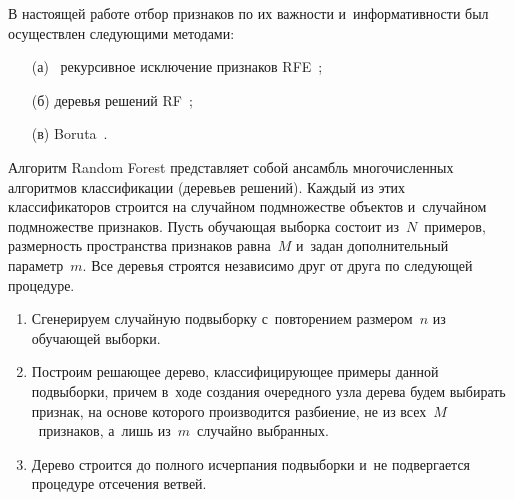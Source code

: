 \begin{multicols}{2}
  В настоящей работе отбор признаков по их важности и~информативности 
был осуществлен следующими методами:
\begin{itemize}
\item[(а)]~рекурсивное исключение 
признаков RFE~\cite{9-sev}; 
\item[(б)] деревья решений RF~\cite{10-sev}; 
\item[(в)] Boruta~\cite{4-sev}.
\end{itemize}
  
  Алгоритм Random Forest представляет собой ансамбль многочисленных 
алгоритмов классификации (деревьев решений). Каждый из этих 
классификаторов строится на случайном подмножестве объектов 
и~случайном подмножестве признаков. Пусть обучающая выборка состоит 
из~$N$~примеров, размерность пространства признаков равна~$M$ 
и~задан дополнительный параметр~$m$. Все деревья строятся независимо 
друг от друга по следующей процедуре.
  \begin{enumerate}[1.]
  \item Сгенерируем случайную подвыборку с~повторением размером~$n$ из 
обучающей выборки.
  \item Построим решающее дерево, классифицирующее примеры данной 
подвыборки, причем в~ходе создания очередного узла дерева будем выбирать 
признак, на основе которого производится разбиение, не из 
всех~$M$~признаков, а~лишь из~$m$~случайно выбранных.
  \item Дерево строится до полного исчерпания подвыборки и~не 
подвергается процедуре отсечения ветвей.
  \end{enumerate}
  
     \begin{table*}[b]\small %
  \begin{center}
  \vspace*{2ex}
  

\end{center}
\end{table*}
\end{multicols}
